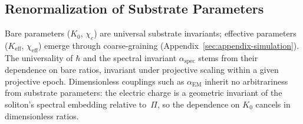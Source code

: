 \subsection{Renormalization of Substrate Parameters}
  \label{subsec:renormalization}

  Bare parameters ($K_0$, $\chi_c$) are universal substrate invariants;
  effective parameters ($K_{\mathrm{eff}}$, $\chi_{\mathrm{eff}}$)
  emerge through coarse-graining
  (Appendix~\ref{sec:appendix-simulation}).
  The universality of $\hbar$ and the spectral invariant
  $\alpha_{\mathrm{spec}}$ stems from their dependence on bare ratios,
  invariant under projective scaling within a given projective epoch.
  Dimensionless couplings such as $\alpha_{\mathrm{EM}}$ inherit no
  arbitrariness from substrate parameters: the electric charge is a
  geometric invariant of the soliton's spectral embedding relative
  to~$\Pi$, so the dependence on $K_0$ cancels in dimensionless ratios.
